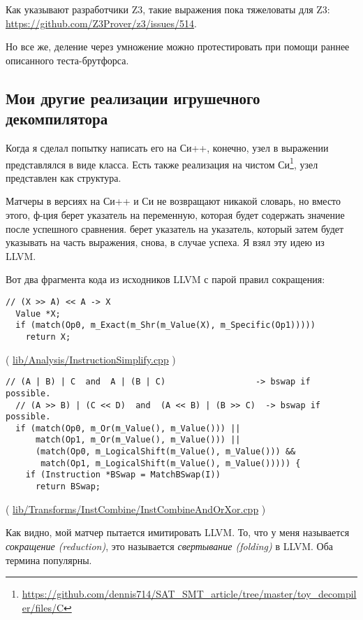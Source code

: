 Как указывают разработчики Z3, такие выражения пока тяжеловаты для Z3:
\url{https://github.com/Z3Prover/z3/issues/514}.

Но все же, деление через умножение можно протестировать при помощи раннее описанного теста-брутфорса.

\subsection{Мои другие реализации игрушечного декомпилятора}

Когда я сделал попытку написать его на Си++, конечно, узел в выражении представлялся в виде класса.
Есть также реализация на чистом Си\footnote{\url{https://github.com/dennis714/SAT_SMT_article/tree/master/toy_decompiler/files/C}}, узел представлен как структура.

Матчеры в версиях на Си++ и Си не возвращают никакой словарь, но вместо этого, ф-ция 
берет указатель на переменную, которая будет содержать значение после успешного сравнения.
 берет указатель на указатель, который затем будет указывать на часть выражения, снова, в случае успеха.
Я взял эту идею из LLVM.

Вот два фрагмента кода из исходников LLVM с парой правил сокращения:

\begin{lstlisting}
// (X >> A) << A -> X
  Value *X;
  if (match(Op0, m_Exact(m_Shr(m_Value(X), m_Specific(Op1)))))
    return X;
\end{lstlisting}

( \href{http://llvm.org/docs/doxygen/html/InstructionSimplify_8cpp_source.html}{lib/Analysis/InstructionSimplify.cpp} )

\begin{lstlisting}
// (A | B) | C  and  A | (B | C)                  -> bswap if possible.
  // (A >> B) | (C << D)  and  (A << B) | (B >> C)  -> bswap if possible.
  if (match(Op0, m_Or(m_Value(), m_Value())) ||
      match(Op1, m_Or(m_Value(), m_Value())) ||
      (match(Op0, m_LogicalShift(m_Value(), m_Value())) &&
       match(Op1, m_LogicalShift(m_Value(), m_Value())))) {
    if (Instruction *BSwap = MatchBSwap(I))
      return BSwap;
\end{lstlisting}
( \href{https://github.com/numba/llvm-mirror/blob/master/lib/Transforms/InstCombine/InstCombineAndOrXor.cpp}{lib/Transforms/InstCombine/InstCombineAndOrXor.cpp} )

Как видно, мой матчер пытается имитировать LLVM.
То, что у меня называется \textit{сокращение (reduction)}, это называется \textit{свертывание (folding)} в LLVM.
Оба термина популярны.

